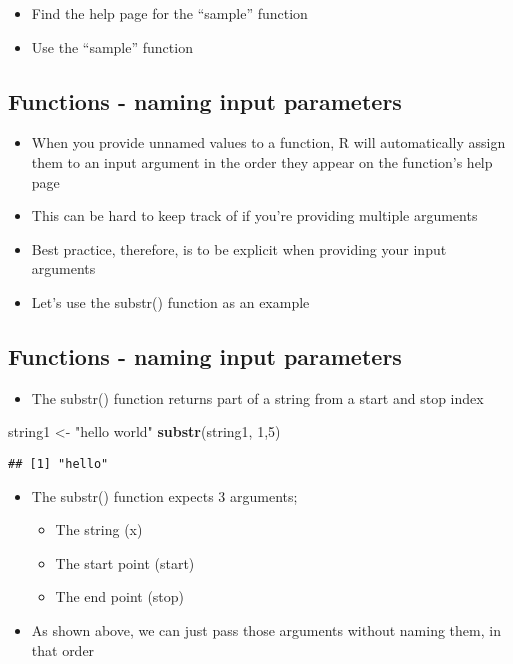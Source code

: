 \documentclass[]{article}
\newenvironment{Shaded}{\begin{snugshade}}{\end{snugshade}}
\newcommand{\KeywordTok}[1]{\textcolor[rgb]{0.13,0.29,0.53}{\textbf{#1}}}
\newcommand{\DecValTok}[1]{\textcolor[rgb]{0.00,0.00,0.81}{#1}}
\newcommand{\StringTok}[1]{\textcolor[rgb]{0.31,0.60,0.02}{#1}}
\newcommand{\NormalTok}[1]{#1}
\providecommand{\tightlist}{%
  \setlength{\itemsep}{0pt}\setlength{\parskip}{0pt}}
\begin{document}
\begin{itemize}
\tightlist
\item
  Find the help page for the ``sample'' function
\item
  Use the ``sample'' function
\end{itemize}

\subsection{Functions - naming input
parameters}\label{functions---naming-input-parameters}

\begin{itemize}
\tightlist
\item
  When you provide unnamed values to a function, R will automatically
  assign them to an input argument in the order they appear on the
  function's help page
\item
  This can be hard to keep track of if you're providing multiple
  arguments
\item
  Best practice, therefore, is to be explicit when providing your input
  arguments
\item
  Let's use the substr() function as an example
\end{itemize}

\subsection{Functions - naming input
parameters}\label{functions---naming-input-parameters-1}

\begin{itemize}
\tightlist
\item
  The substr() function returns part of a string from a start and stop
  index
\end{itemize}

\begin{Shaded}
\begin{Highlighting}[]
\NormalTok{string1 <-}\StringTok{ "hello world"}
\KeywordTok{substr}\NormalTok{(string1, }\DecValTok{1}\NormalTok{,}\DecValTok{5}\NormalTok{)}
\end{Highlighting}
\end{Shaded}

\begin{verbatim}
## [1] "hello"
\end{verbatim}

\begin{itemize}
\tightlist
\item
  The substr() function expects 3 arguments;

  \begin{itemize}
  \tightlist
  \item
    The string (x)
  \item
    The start point (start)
  \item
    The end point (stop)
  \end{itemize}
\item
  As shown above, we can just pass those arguments without naming them,
  in that order
\end{itemize}
\end{document}
